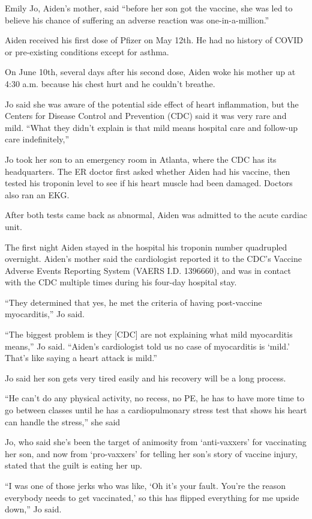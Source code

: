 Emily Jo, Aiden’s mother, said “before her son got the vaccine, she was led to
believe his chance of suffering an adverse reaction was one-in-a-million.”

Aiden received his first dose of Pfizer on May 12th. He had no history of COVID
or pre-existing conditions except for asthma.

On June 10th, several days after his second dose, Aiden woke his mother up at
4:30 a.m. because his chest hurt and he couldn’t breathe.

Jo said she was aware of the potential side effect of heart inflammation, but
the Centers for Disease Control and Prevention (CDC) said it was very rare and
mild. “What they didn’t explain is that mild means hospital care and follow-up
care indefinitely,”

Jo took her son to an emergency room in Atlanta, where the CDC has its
headquarters. The ER doctor first asked whether Aiden had his vaccine, then
tested his troponin level to see if his heart muscle had been damaged. Doctors
also ran an EKG.

After both tests came back as abnormal, Aiden was admitted to the acute cardiac
unit.

The first night Aiden stayed in the hospital his troponin number quadrupled
overnight. Aiden’s mother said the cardiologist reported it to the CDC’s Vaccine
Adverse Events Reporting System (VAERS I.D. 1396660), and was in contact with
the CDC multiple times during his four-day hospital stay.

“They determined that yes, he met the criteria of having post-vaccine
myocarditis,” Jo said.

“The biggest problem is they [CDC] are not explaining what mild myocarditis
means,” Jo said. “Aiden’s cardiologist told us no case of myocarditis is ‘mild.’
That’s like saying a heart attack is mild.”

Jo said her son gets very tired easily and his recovery will be a long process.

“He can’t do any physical activity, no recess, no PE, he has to have more time
to go between classes until he has a cardiopulmonary stress test that shows his
heart can handle the stress,” she said

Jo, who said she’s been the target of animosity from ‘anti-vaxxers’ for
vaccinating her son, and now from ‘pro-vaxxers’ for telling her son’s story of
vaccine injury, stated that the guilt is eating her up.

“I was one of those jerks who was like, ‘Oh it’s your fault. You’re the reason
everybody needs to get vaccinated,’ so this has flipped everything for me upside
down,” Jo said.

